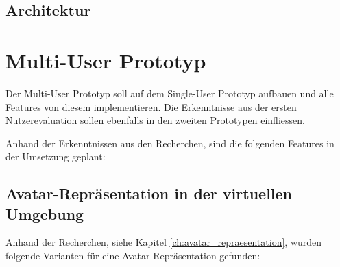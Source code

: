\subsection{Architektur}

\pagebreak
\section{Multi-User Prototyp}
Der Multi-User Prototyp soll auf dem Single-User Prototyp aufbauen und alle Features von diesem implementieren. Die Erkenntnisse aus der ersten Nutzerevaluation sollen ebenfalls in den zweiten Prototypen einfliessen.

Anhand der Erkenntnissen aus den Recherchen, sind die folgenden Features in der Umsetzung geplant:

\subsection{Avatar-Repräsentation in der virtuellen Umgebung}
\label{ch:avatar-repraesentation}
Anhand der Recherchen, siehe Kapitel \ref{ch:avatar_repraesentation}, wurden folgende Varianten für eine Avatar-Repräsentation gefunden:
